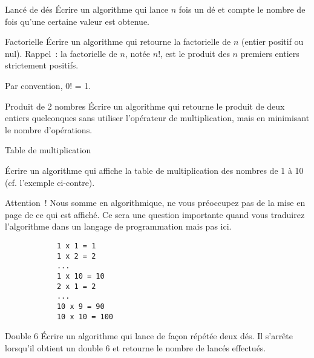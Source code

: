 	\begin{Exercice}{Lancé de dés}
		Écrire un algorithme qui lance $n$ fois un dé
		et compte le nombre de fois qu’une certaine valeur est obtenue.
		\begin{LDA}
		\end{LDA}
	\end{Exercice}
	
	\begin{Exercice}{Factorielle}
		Écrire un algorithme qui retourne la factorielle de $n$ (entier positif ou
		nul). Rappel~: la factorielle de $n$, notée $n$!, est le produit des $n$
		premiers entiers strictement positifs. 
		
		Par convention, 0! = 1.
	\end{Exercice}

	\begin{Exercice}{Produit de 2 nombres}
		Écrire un algorithme qui retourne le produit de deux entiers quelconques
		sans utiliser l’opérateur de multiplication, mais en minimisant le
		nombre d’opérations.
	\end{Exercice}

	\begin{Exercice}{Table de multiplication}

		\begin{minipage}[t]{10cm}
			Écrire un algorithme qui affiche la table de multiplication
			des nombres de 1 à 10
			(cf. l’exemple ci-contre).

			\medskip
			Attention~! Nous somme en algorithmique, 
			ne vous préoccupez pas de la mise en page de ce qui est affiché.
			Ce sera une question importante quand vous traduirez 
			l’algorithme dans un langage de programmation mais pas ici. 
		\end{minipage}
		\qquad
		\begin{minipage}[t]{4cm}
		\begin{verbatim}
			1 x 1 = 1
			1 x 2 = 2
			...
			1 x 10 = 10
			2 x 1 = 2
			...
			10 x 9 = 90
			10 x 10 = 100
		\end{verbatim}
		\end{minipage}		
	\end{Exercice}
	
	\begin{Exercice}{Double 6}
		Écrire un algorithme qui lance de façon répétée deux dés.
		Il s’arrête lorsqu’il obtient un double 6
		et retourne le nombre de lancés effectués.
	\end{Exercice}
	
